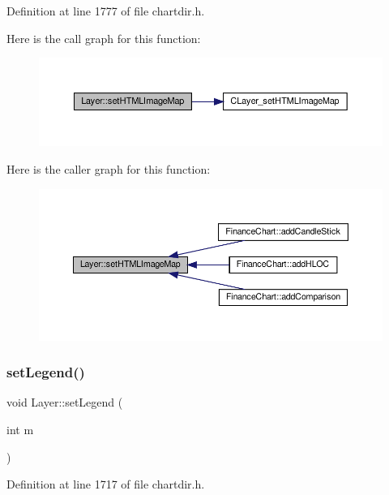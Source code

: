 Definition at line 1777 of file chartdir.\+h.

Here is the call graph for this function\+:
\nopagebreak
\begin{figure}[H]
\begin{center}
\leavevmode
\includegraphics[width=350pt]{class_layer_a236aba467e0154dcfff6541731dc9ec5_cgraph}
\end{center}
\end{figure}
Here is the caller graph for this function\+:
\nopagebreak
\begin{figure}[H]
\begin{center}
\leavevmode
\includegraphics[width=350pt]{class_layer_a236aba467e0154dcfff6541731dc9ec5_icgraph}
\end{center}
\end{figure}
\mbox{\label{class_layer_a9e9f2fc29249b58cf56048c7c2861de7}} 
\subsubsection{\texorpdfstring{set\+Legend()}{setLegend()}}
{\footnotesize\ttfamily void Layer\+::set\+Legend (\begin{DoxyParamCaption}\item[{int}]{m }\end{DoxyParamCaption})\hspace{0.3cm}{\ttfamily [inline]}}



Definition at line 1717 of file chartdir.\+h.

